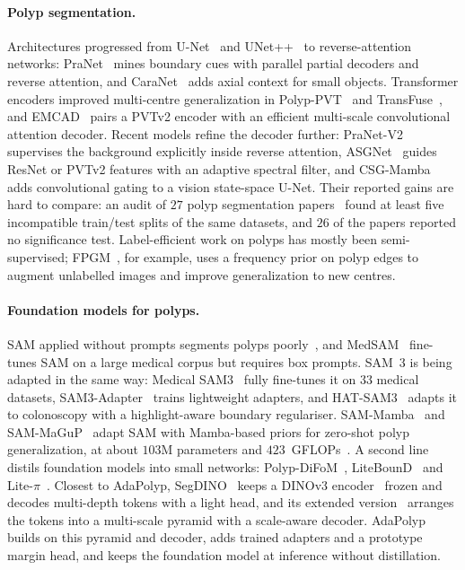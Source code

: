 \documentclass{ieeeaccess}
\begin{document}
\paragraph{Polyp segmentation.} Architectures progressed from U-Net~\cite{ronneberger2015unet} and UNet++~\cite{zhou2018unetplusplus} to reverse-attention networks: PraNet~\cite{fan2020pranet} mines boundary cues with parallel partial decoders and reverse attention, and CaraNet~\cite{lou2022caranet} adds axial context for small objects. Transformer encoders improved multi-centre generalization in Polyp-PVT~\cite{dong2021polyp} and TransFuse~\cite{zhang2021transfuse}, and EMCAD~\cite{rahman2024emcad} pairs a PVTv2 encoder with an efficient multi-scale convolutional attention decoder. Recent models refine the decoder further: PraNet-V2~\cite{hu2026pranetv2} supervises the background explicitly inside reverse attention, ASGNet~\cite{sun2026asgnet} guides ResNet or PVTv2 features with an adaptive spectral filter, and CSG-Mamba~\cite{wang2026csgmamba} adds convolutional gating to a vision state-space U-Net. Their reported gains are hard to compare: an audit of $27$ polyp segmentation papers~\cite{urooj2026metrics} found at least five incompatible train/test splits of the same datasets, and $26$ of the papers reported no significance test. Label-efficient work on polyps has mostly been semi-supervised; FPGM~\cite{xi2025fpgm}, for example, uses a frequency prior on polyp edges to augment unlabelled images and improve generalization to new centres.

\paragraph{Foundation models for polyps.} SAM applied without prompts segments polyps poorly~\cite{zhou2023samPolyps}, and MedSAM~\cite{ma2024medsam} fine-tunes SAM on a large medical corpus but requires box prompts. SAM~3 is being adapted in the same way: Medical SAM3~\cite{jiang2026medsam3} fully fine-tunes it on $33$ medical datasets, SAM3-Adapter~\cite{chen2025sam3adapter} trains lightweight adapters, and HAT-SAM3~\cite{li2026hatsam3} adapts it to colonoscopy with a highlight-aware boundary regulariser. SAM-Mamba~\cite{dutta2024sammamba} and SAM-MaGuP~\cite{dutta2025sammagup} adapt SAM with Mamba-based priors for zero-shot polyp generalization, at about $103$M parameters and $423$~GFLOPs~\cite{agnihotri2026litebound}. A second line distils foundation models into small networks: Polyp-DiFoM~\cite{agnihotri2025difom}, LiteBounD~\cite{agnihotri2026litebound} and Lite-$\pi$~\cite{agnihotri2026litepi}. Closest to AdaPolyp, SegDINO~\cite{yang2025segdino} keeps a DINOv3 encoder~\cite{simeoni2025dinov3} frozen and decodes multi-depth tokens with a light head, and its extended version~\cite{yang2026segdino} arranges the tokens into a multi-scale pyramid with a scale-aware decoder. AdaPolyp builds on this pyramid and decoder, adds trained adapters and a prototype margin head, and keeps the foundation model at inference without distillation.
\end{document}
